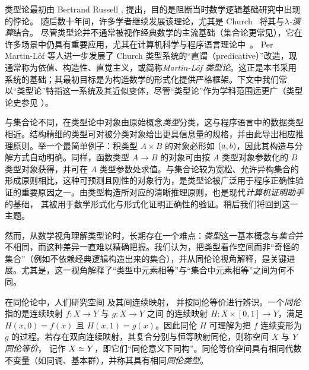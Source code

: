 类型论最初由 Bertrand Russell \cite{Russell:1908}, 提出，目的是阻断当时数学逻辑基础研究中出现的悖论。
随后数十年间，许多学者继续发展该理论，尤其是 Church~\cite{Church:1940tu,Church:1941tc} 将其与\textit{$\lambda$-演算}结合。
尽管类型论并不通常被视作经典数学的主流基础（集合论更常见），它在许多场景中仍具有重要应用，尤其在计算机科学与程序语言理论中~\cite{Pierce-TAPL}。
%
%
%
Per Martin-L\"{o}f \cite{Martin-Lof-1972,Martin-Lof-1973,Martin-Lof-1979,martin-lof:bibliopolis} 等人进一步发展了 Church 类型系统的“直谓（predicative）”改造，现通常称为依值、构造性、直觉主义，或简称\emph{Martin\--L\"of 类型论}。这正是本书采用系统的基础；其最初目标是为构造数学的形式化提供严格框架。下文中我们常以“类型论”特指这一系统及其近似变体，尽管“类型论”作为学科范围远更广（类型论史参见 \cite{somma,kamar}）。

与集合论不同，在类型论中对象由原始概念\emph{类型}分类，这与程序语言中的数据类型相近。结构精细的类型可对被分类对象给出更具信息量的规格，并由此导出相应推理原则。举一个最简单例子：积类型 $A\times B$ 的对象必形如 ${\mathopen{}(a,b)\mathclose{}}$，因此其构造与分解方式自动明确。同样，函数类型 $A\to B$ 的对象可由按 $A$ 类型对象参数化的 $B$ 类型对象获得，并可在 $A$ 类型参数处求值。与集合论较为宽松、允许异构集合的形成原则相比，这种可预测且刚性的对象行为，是类型论被广泛用于程序正确性验证的重要原因之一。由类型构造所对应的清晰推理原则，也是现代\emph{计算机证明助手}的基础，%
%
%
其被用于数学形式化与形式化证明正确性的验证。稍后我们将回到这一主题。

然而，从数学视角理解类型论时，长期存在一个难点：\emph{类型}这一基本概念与\emph{集合}并不相同，而这种差异一直难以精确把握。我们认为，把类型看作空间而非“奇怪的集合”（例如不依赖经典逻辑构造出来的集合），并从同伦论视角解释，是关键进展。尤其是，这一视角解释了“类型中元素相等”与“集合中元素相等”之间为何不同。

在同伦论中，人们研究空间
%
及其间连续映射，
%
并按同伦等价进行辨识。一个\emph{同伦}
%
指的是连续映射 $f : X \to Y$
与 $g : X\to Y$ 之间
的连续映射 $H : X \times [0, 1] \to Y$，满足
$H(x, 0) = f (x)$ 且 $H(x, 1) = g(x)$。因此同伦 $H$ 可理解为把 $f$ 连续变形为 $g$ 的过程。若存在双向连续映射，其复合分别与恒等映射同伦，则称空间 $X$ 与 $Y$ \emph{同伦等价}，
%
记作 $X \simeq Y$，即它们“同伦意义下同构”。同伦等价空间具有相同代数不变量（如同调、基本群），并称其具有相同\emph{同伦类型}。

